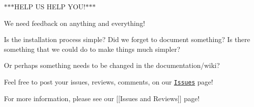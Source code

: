 $\ast$$\ast$$\ast$\-H\-E\-L\-P U\-S H\-E\-L\-P Y\-O\-U!$\ast$$\ast$$\ast$

We need feedback on anything and everything!

Is the installation process simple? Did we forget to document something? Is there something that we could do to make things much simpler?

Or perhaps something needs to be changed in the documentation/wiki?

Feel free to post your issues, reviews, comments, on our \href{https://github.com/Calvin-CS/TSGL/issues}{\tt Issues} page!

For more information, please see our \mbox{[}\mbox{[}Issues and Reviews\mbox{]}\mbox{]} page! 